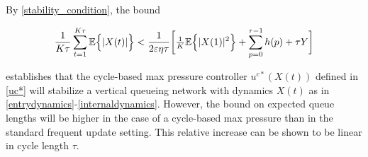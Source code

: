 By \eqref{stability_condition}, the bound 
\begin{small}
\begin{equation*} \label{CYCLE_BOUNDS} 
\dfrac{1}{K \tau} \sum_{t=1}^{K \tau}  \expectation{\vert X(t )\vert} <  \frac{1}{2\varepsilon\eta \tau }\bigg[ \tfrac{1}{K} \expectation{\vert X( 1)\vert^2} +  \sum_{p=0 }^{\tau - 1} h(p) + \tau Y  \bigg]
\end{equation*}
\end{small}establishes that the cycle-based max pressure controller $u^{c*}(X(t))$ defined in \eqref{uc*} will stabilize a vertical queueing network with dynamics $X(t)$ as in \eqref{entrydynamics}-\eqref{internaldynamics}. However, the bound on expected queue lengths will be higher in the case of a cycle-based max pressure than in the standard frequent update setting. This relative increase can be shown to be linear in cycle length $\tau$. 












